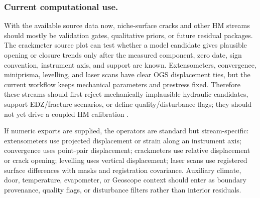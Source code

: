 \subsubsection*{Current computational use.}
With the available source data now, niche-surface cracks and other HM streams should
mostly be validation gates, qualitative priors, or future residual packages.  The
crackmeter source plot can test whether a model candidate gives plausible opening
or closure trends only after the measured component, zero date, sign convention,
instrument axis, and support are known.  Extensometers, convergence, miniprisma,
levelling, and laser scans have clear OGS displacement ties, but the current
workflow keeps mechanical parameters and prestress fixed.  Therefore these streams
should first reject mechanically implausible hydraulic candidates, support
EDZ/fracture scenarios, or define quality/disturbance flags; they should not yet
drive a coupled HM calibration
\citep[Table~1]{Ziefle2024Characterization}
\citep[abstract and Sec.~2]{Ziefle2017SeasonalHM}
\citep[PDF p.~4 and p.~8]{CDATDMinutes2026Email}
\citep[provided HM source files and generated trend figures]{CDAProvidedMeasurementFiles2025}.

If numeric exports are supplied, the operators are standard but stream-specific:
extensometers use projected displacement or strain along an instrument axis;
convergence uses point-pair displacement; crackmeters use relative displacement or
crack opening; levelling uses vertical displacement; laser scans use registered
surface differences with masks and registration covariance.  Auxiliary climate,
door, temperature, evapometer, or Geoscope context should enter as boundary
provenance, quality flags, or disturbance filters rather than interior residuals.

